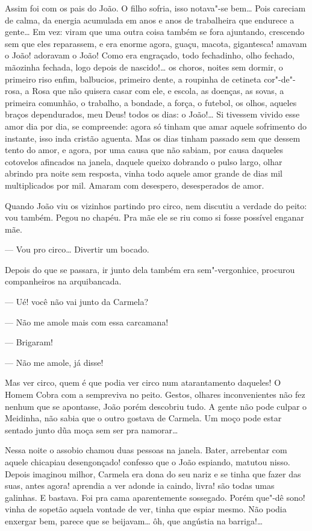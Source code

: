 Assim foi com os pais do João. O filho sofria, isso notava"-se bem\ldots{}
Pois careciam de calma, da energia acumulada em anos e anos de
trabalheira que endurece a gente\ldots{} Em vez: viram que uma outra coisa
também se fora ajuntando, crescendo sem que eles reparassem, e era
enorme agora, guaçu, macota, gigantesca! amavam o João! adoravam o João!
Como era engraçado, todo fechadinho, olho fechado, mãozinha fechada,
logo depois de nascido!\ldots{} os choros, noites sem dormir, o primeiro riso
enfim, balbucios, primeiro dente, a roupinha de cetineta cor"-de"-rosa, a
Rosa que não quisera casar com ele, e escola, as doenças, as sovas, a
primeira comunhão, o trabalho, a bondade, a força, o futebol, os olhos,
aqueles braços dependurados, meu Deus! todos os dias: o João!\ldots{} Si
tivessem vivido esse amor dia por dia, se compreende: agora só tinham
que amar aquele sofrimento do instante, isso inda cristão aguenta. Mas
os dias tinham passado sem que dessem tento do amor, e agora, por uma
causa que não sabiam, por causa daqueles cotovelos afincados na janela,
daquele queixo dobrando o pulso largo, olhar abrindo pra noite sem
resposta, vinha todo aquele amor grande de dias mil multiplicados por
mil. Amaram com desespero, desesperados de amor.

Quando João viu os vizinhos partindo pro circo, nem discutiu a verdade
do peito: vou também. Pegou no chapéu. Pra mãe ele se riu como si fosse
possível enganar mãe.

--- Vou pro circo\ldots{} Divertir um bocado.

Depois do que se passara, ir junto dela também era sem"-vergonhice,
procurou companheiros na arquibancada.

--- Ué! você não vai junto da Carmela?

--- Não me amole mais com essa carcamana!

--- Brigaram!

--- Não me amole, já disse!

Mas ver circo, quem é que podia ver circo num atarantamento daqueles! O
Homem Cobra com a sempreviva no peito. Gestos, olhares inconvenientes
não fez nenhum que se apontasse, João porém descobriu tudo. A gente não
pode culpar o Meidinha, não sabia que o outro gostava de Carmela. Um
moço pode estar sentado junto dũa moça sem ser pra namorar\ldots{}

Nessa noite o assobio chamou duas pessoas na janela. Bater, arrebentar
com aquele chicapiau desengonçado! confesso que o João espiando, matutou
nisso. Depois imaginou milhor, Carmela era dona do seu nariz e se tinha
que fazer das suas, antes agora! aprendia a ver adonde ia caindo, livra!
são todas umas galinhas. E bastava. Foi pra cama aparentemente
sossegado. Porém que"-dê sono! vinha de sopetão aquela vontade de ver,
tinha que espiar mesmo. Não podia enxergar bem, parece que se
beijavam\ldots{} ôh, que angústia na barriga!\ldots{} 

